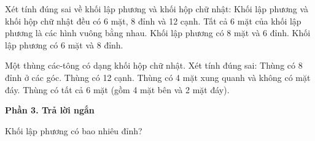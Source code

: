 \begin{ex} %
Xét tính đúng sai về khối lập phương và khối hộp chữ nhật:
\choiceTF
{\True Khối lập phương và khối hộp chữ nhật đều có 6 mặt, 8 đỉnh và 12 cạnh.}
{\True Tất cả 6 mặt của khối lập phương là các hình vuông bằng nhau.}
{Khối lập phương có 8 mặt và 6 đỉnh.}
{\True Khối lập phương có 6 mặt và 8 đỉnh.}
\end{ex}

\begin{ex} %
Một thùng các-tông có dạng khối hộp chữ nhật. Xét tính đúng sai:
\choiceTF
{\True Thùng có 8 đỉnh ở các góc.}
{\True Thùng có 12 cạnh.}
{Thùng có 4 mặt xung quanh và không có mặt đáy.}
{\True Thùng có tất cả 6 mặt (gồm 4 mặt bên và 2 mặt đáy).}
\end{ex}

\textbf{Phần 3. Trả lời ngắn}

\begin{ex} %
Khối lập phương có bao nhiêu đỉnh?
\end{ex}

